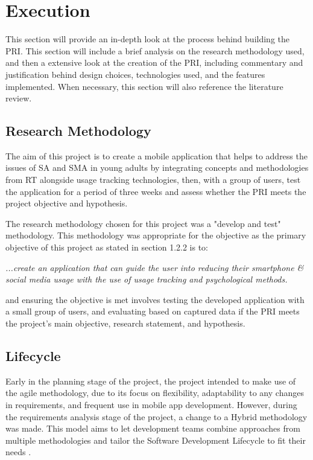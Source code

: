 \documentclass[12pt]{article}
\begin{document}
\section{Execution}
This section will provide an in-depth look at the process behind building the PRI. This section will 
include a brief analysis on the research methodology used, and then a extensive look at the creation of the PRI, including commentary 
and justification behind design choices, technologies used, and the features implemented. When necessary, this
section will also reference the literature review.

\subsection{Research Methodology}
The aim of this project is to create a mobile application that helps to address the issues of SA and SMA in young adults by integrating concepts and methodologies from RT alongside usage 
tracking technologies, then, with a group of users, test the application for a period of three weeks and assess whether the PRI meets the project objective and hypothesis.\newline

The research methodology chosen for this project was a "develop and test" methodology. This methodology was appropriate for the objective as the 
primary objective of this project as stated in section 1.2.2 is to: \newline

\textit{...create an application that can guide the user into reducing their smartphone \& social media usage 
with the use of usage tracking and psychological methods.}\newline

and ensuring the objective is met involves testing the developed application with a small group of users, and evaluating based on captured data if
the PRI meets the project's main objective, research statement, and hypothesis. 


\subsection{Lifecycle}
Early in the planning stage of the project, the project intended to make use of the agile methodology, due to
its focus on flexibility, adaptability to any changes in requirements, and frequent use in mobile app development. However, during the
requirements analysis stage of the project, a change to a Hybrid methodology was made. This model aims to let development teams combine approaches from
multiple methodologies and tailor the Software Development Lifecycle to fit their needs . 
\end{document}
